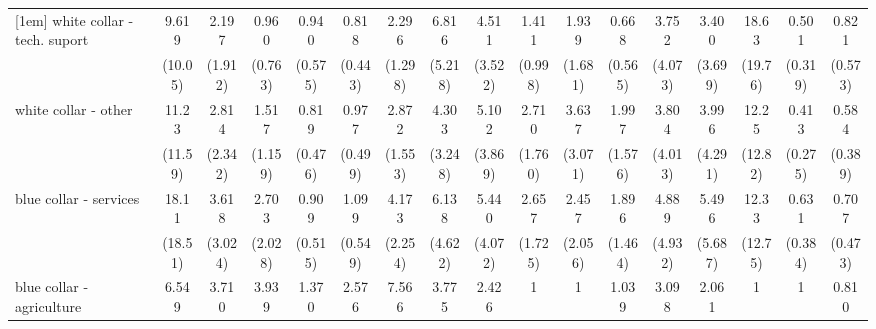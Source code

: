 {\begin{tabular}{l*{16}{c}}
[1em]
white collar - tech. suport&       9.619\sym{*}  &       2.197         &       0.960         &       0.940         &       0.818         &       2.296         &       6.816\sym{*}  &       4.511         &       1.411         &       1.939         &       0.668         &       3.752         &       3.400         &       18.63\sym{**} &       0.501         &       0.821         \\
                    &     (10.05)         &     (1.912)         &     (0.763)         &     (0.575)         &     (0.443)         &     (1.298)         &     (5.218)         &     (3.522)         &     (0.998)         &     (1.681)         &     (0.565)         &     (4.073)         &     (3.699)         &     (19.76)         &     (0.319)         &     (0.573)         \\
[1em]
white collar - other&       11.23\sym{*}  &       2.814         &       1.517         &       0.819         &       0.977         &       2.872         &       4.303         &       5.102\sym{*}  &       2.710         &       3.637         &       1.997         &       3.804         &       3.996         &       12.25\sym{*}  &       0.413         &       0.584         \\
                    &     (11.59)         &     (2.342)         &     (1.159)         &     (0.476)         &     (0.499)         &     (1.553)         &     (3.248)         &     (3.869)         &     (1.760)         &     (3.071)         &     (1.576)         &     (4.013)         &     (4.291)         &     (12.82)         &     (0.275)         &     (0.389)         \\
[1em]
blue collar - services&       18.11\sym{**} &       3.618         &       2.703         &       0.909         &       1.099         &       4.173\sym{**} &       6.138\sym{*}  &       5.440\sym{*}  &       2.657         &       2.457         &       1.896         &       4.889         &       5.496         &       12.33\sym{*}  &       0.631         &       0.707         \\
                    &     (18.51)         &     (3.024)         &     (2.028)         &     (0.515)         &     (0.549)         &     (2.254)         &     (4.622)         &     (4.072)         &     (1.725)         &     (2.056)         &     (1.464)         &     (4.932)         &     (5.687)         &     (12.75)         &     (0.384)         &     (0.473)         \\
[1em]
blue collar - agriculture&       6.549         &       3.710         &       3.939         &       1.370         &       2.576         &       7.566\sym{**} &       3.775         &       2.426         &           1         &           1         &       1.039         &       3.098         &       2.061         &           1         &           1         &       0.810         \\

\end{tabular}}
